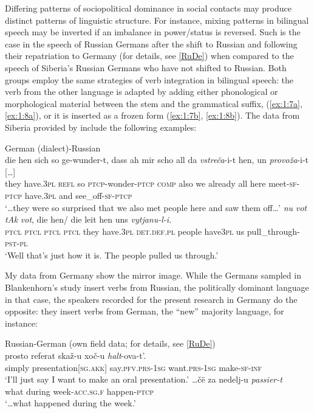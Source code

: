 Differing patterns of sociopolitical dominance in social contacts may produce distinct patterns of linguistic structure. For instance, mixing patterns in bilingual speech may be inverted if an imbalance in power/status is reversed. Such is the case in the speech of Russian Germans after the shift to Russian and following their repatriation to Germany (for details, see \ref{RuDe}) when compared to the speech of Siberia's Russian Germans who have not shifted to Russian. Both groups employ the same strategies of verb integration in bilingual speech: the verb from the other language is adapted by adding either phonological or morphological material between the stem and the grammatical suffix, (\ref{ex:1:7a}, \ref{ex:1:8a}), or it is inserted as a frozen form (\ref{ex:1:7b}, \ref{ex:1:8b}). The data from Siberia provided by \citet[][]{blankenhorn} include the following examples:

\ea
German (dialect)-Russian \citep[][103,93]{blankenhorn}\\
\ea{\label{ex:1:7a}}
\gll [\dots] die hen sich so ge-wunder-t, dass ah mir scho all da \textit{vstreča}-i-t hen, un \textit{provoža}-i-t [\dots] \\
    {} they have.\textsc{3pl} \textsc{refl} so \textsc{ptcp}-wonder-\textsc{ptcp} \textsc{comp} also we already all here 
    meet-\textsc{sf-ptcp} have.\textsc{3pl} and see\_off-\textsc{sf-ptcp}\\
\glt `\dots they were so surprised that we also met people here and saw them off\dots'
\ex{\label{ex:1:7b}}
\gll [\dots] \textit{nu} \textit{vot} \textit{tAk} \textit{vot}, die hen/ die leit hen uns \textit{vytjanu-l-i}.\\
	{} \textsc{ptcl} \textsc{ptcl} \textsc{ptcl} \textsc{ptcl} they have.\textsc{3pl} \textsc{det.def.pl} people have\textsc{3pl} us pull\_through-\textsc{pst-pl}\\
\glt `Well that's just how it is. The people pulled us through.'
\z
\z

\noindent My data from Germany show the mirror image. While the Germans sampled in Blankenhorn's \citeyear[][]{blankenhorn} study insert verbs from Russian, the politically dominant language in that case, the speakers recorded for the present research in Germany do the opposite: they insert verbs from German, the ``new'' majority language, for instance:

\ea
Russian-German (own field data; for details, see \ref{RuDe})\\
\ea{\label{ex:1:8a}}
\gll prosto referat skaž-u xoč-u \textit{halt}-ova-t’.\\
	simply presentation[\textsc{sg.akk}] say.\textsc{pfv.prs-1sg} want.\textsc{prs-1sg}   make-\textsc{sf-inf}\\
\glt `I'll just say I want to make an oral presentation.'
\ex{\label{ex:1:8b}}
\gll \dots čë za nedelj-u \textit{passier-t}\\
    what during week-\textsc{acc.sg.f} happen-\textsc{ptcp}\\
\glt `\dots what happened during the week.'
\z
\z

